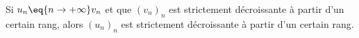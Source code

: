 Si $u_n \eq{n\to+\infty}  v_n$ et que $(v_n)_n$ est strictement décroissante à partir d'un certain rang, alors $(u_n)_n$ est strictement décroissante à partir d'un certain rang.

\begin{reponses}
\end{reponses}

